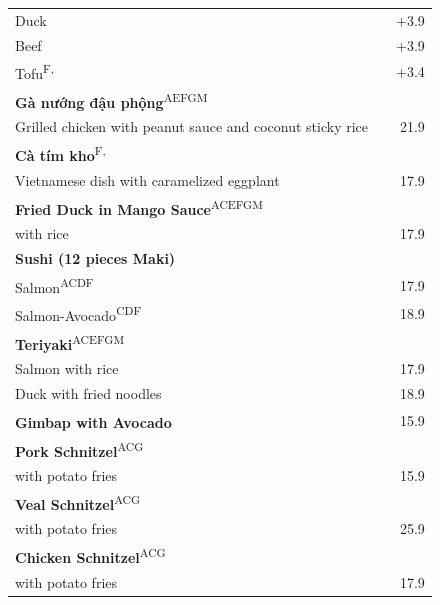 \documentclass[a4paper,12pt]{article}
\newcommand{\vegan}{\textbf{\scriptsize \color{vegan}{Vegan}}}
\begin{document}
\begin{multicols}{2}
\begin{tabular}{Lrr}
\hspace{0.4cm}Duck & & +3.9\\
\hspace{0.4cm}Beef & & +3.9\\
\hspace{0.4cm}Tofu\textsuperscript{{\scriptsize F, \vegan}} & & +3.4\\
\textbf{Gà nướng đậu phộng}\textsuperscript{{\scriptsize AEFGM}}\\
\hspace{0.4cm}\scriptsize Grilled chicken with peanut sauce and coconut sticky rice & & 21.9\\
\textbf{Cà tím kho}\textsuperscript{{\scriptsize F, \vegan}}\\
\hspace{0.4cm}\scriptsize Vietnamese dish with caramelized eggplant & & 17.9\\
\textbf{Fried Duck in Mango Sauce}\textsuperscript{{\scriptsize ACEFGM}}\\
\hspace{0.4cm}\scriptsize with rice & & 17.9\\
\textbf{Sushi (12 pieces Maki)}\\
\hspace{0.4cm}Salmon\textsuperscript{{\scriptsize ACDF}} & & 17.9\\
\hspace{0.4cm}Salmon-Avocado\textsuperscript{{\scriptsize CDF}} & & 18.9\\
\textbf{Teriyaki}\textsuperscript{{\scriptsize ACEFGM}}\\
\hspace{0.4cm}Salmon with rice & & 17.9\\
\hspace{0.4cm}Duck with fried noodles & & 18.9\\
\textbf{Gimbap with Avocado}\textsuperscript{{\scriptsize \vegan}} & & 15.9\\
\textbf{Pork Schnitzel}\textsuperscript{{\scriptsize ACG}}\\
\hspace{0.4cm}\scriptsize with potato fries & & 15.9\\
\textbf{Veal Schnitzel}\textsuperscript{{\scriptsize ACG}}\\
\hspace{0.4cm}\scriptsize with potato fries & & 25.9\\
\textbf{Chicken Schnitzel}\textsuperscript{{\scriptsize ACG}}\\
\hspace{0.4cm}\scriptsize with potato fries & & 17.9
\end{tabular}

\end{multicols}
\end{document}
